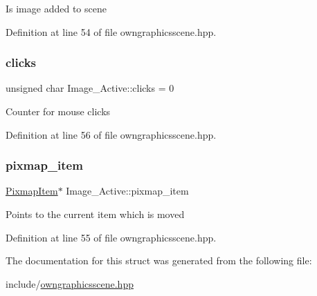 Is image added to scene 

Definition at line 54 of file owngraphicsscene.\+hpp.

\mbox{\label{structImage__Active_abb039226daf0372a8d88c842f5eb140f}} 
\subsubsection{\texorpdfstring{clicks}{clicks}}
{\footnotesize\ttfamily unsigned char Image\+\_\+\+Active\+::clicks = 0}

Counter for mouse clicks 

Definition at line 56 of file owngraphicsscene.\+hpp.

\mbox{\label{structImage__Active_aa007ea3c9ba4830bbc2706af51820c20}} 
\subsubsection{\texorpdfstring{pixmap\+\_\+item}{pixmap\_item}}
{\footnotesize\ttfamily \mbox{\hyperlink{classPixmapItem}{Pixmap\+Item}}$\ast$ Image\+\_\+\+Active\+::pixmap\+\_\+item}

Points to the current item which is moved 

Definition at line 55 of file owngraphicsscene.\+hpp.



The documentation for this struct was generated from the following file\+:\begin{DoxyCompactItemize}
\item 
include/\mbox{\hyperlink{owngraphicsscene_8hpp}{owngraphicsscene.\+hpp}}\end{DoxyCompactItemize}
